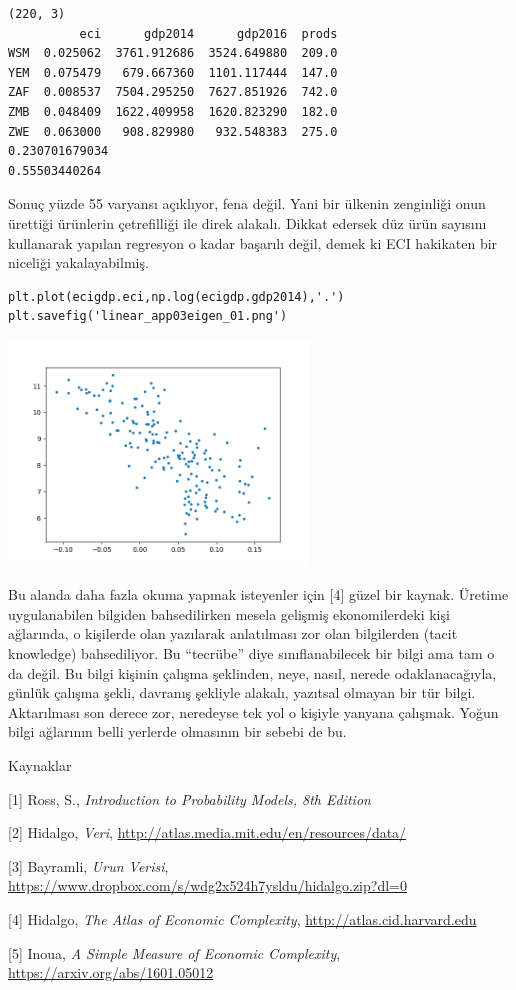 \documentclass[12pt,fleqn]{article}\usepackage{../../common}
\begin{document}
\begin{verbatim}
(220, 3)
          eci      gdp2014      gdp2016  prods
WSM  0.025062  3761.912686  3524.649880  209.0
YEM  0.075479   679.667360  1101.117444  147.0
ZAF  0.008537  7504.295250  7627.851926  742.0
ZMB  0.048409  1622.409958  1620.823290  182.0
ZWE  0.063000   908.829980   932.548383  275.0
0.230701679034
0.55503440264
\end{verbatim}

Sonuç yüzde 55 varyansı açıklıyor, fena değil. Yani bir ülkenin zenginliği
onun ürettiği ürünlerin çetrefilliği ile direk alakalı. Dikkat edersek düz
ürün sayısını kullanarak yapılan regresyon o kadar başarılı değil, demek ki
ECI hakikaten bir niceliği yakalayabilmiş.

\begin{verbatim}
plt.plot(ecigdp.eci,np.log(ecigdp.gdp2014),'.')
plt.savefig('linear_app03eigen_01.png')
\end{verbatim}

\includegraphics[height=6cm]{linear_app03eigen_01.png}

Bu alanda daha fazla okuma yapmak isteyenler için [4] güzel bir
kaynak. Üretime uygulanabilen bilgiden bahsedilirken mesela gelişmiş
ekonomilerdeki kişi ağlarında, o kişilerde olan yazılarak anlatılması zor
olan bilgilerden (tacit knowledge) bahsediliyor. Bu ``tecrübe'' diye
sınıflanabilecek bir bilgi ama tam o da değil. Bu bilgi kişinin çalışma
şeklinden, neye, nasıl, nerede odaklanacağıyla, günlük çalışma şekli,
davranış şekliyle alakalı, yazıtsal olmayan bir tür bilgi. Aktarılması son
derece zor, neredeyse tek yol o kişiyle yanyana çalışmak. Yoğun bilgi
ağlarının belli yerlerde olmasının bir sebebi de bu.

Kaynaklar

[1] Ross, S., {\em Introduction to Probability Models, 8th Edition}

[2] Hidalgo, {\em Veri}, \url{http://atlas.media.mit.edu/en/resources/data/}

[3] Bayramli, {\em Urun Verisi}, \url{https://www.dropbox.com/s/wdg2x524h7ysldu/hidalgo.zip?dl=0}

[4] Hidalgo, {\em The Atlas of Economic Complexity}, \url{http://atlas.cid.harvard.edu}

[5] Inoua, {\em A Simple Measure of Economic Complexity}, \url{https://arxiv.org/abs/1601.05012}
\end{document}

